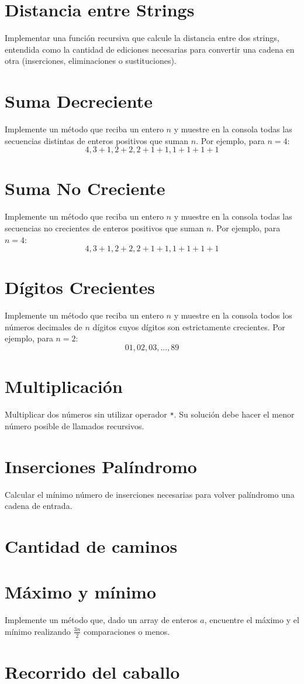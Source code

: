 \section{Distancia entre Strings}
Implementar una función recursiva que calcule la distancia entre dos strings, entendida como la cantidad de ediciones necesarias para convertir una cadena en otra (inserciones, eliminaciones o sustituciones).

\section{Suma Decreciente}
Implemente un método que reciba un entero \( n \) y muestre en la consola todas las secuencias distintas de enteros positivos que suman \( n \). Por ejemplo, para \( n = 4 \):
\[
4, 3+1, 2+2, 2+1+1, 1+1+1+1
\]

\section{Suma No Creciente}
Implemente un método que reciba un entero \( n \) y muestre en la consola todas las secuencias no crecientes de enteros positivos que suman \( n \). Por ejemplo, para \( n = 4 \):
\[
4, 3+1, 2+2, 2+1+1, 1+1+1+1
\]

\section{Dígitos Crecientes}
Implemente un método que reciba un entero \( n \) y muestre en la consola todos los números decimales de \( n \) dígitos cuyos dígitos son estrictamente crecientes. Por ejemplo, para \( n = 2 \):
\[
01, 02, 03, ..., 89
\]
        
\section{Multiplicación}
Multiplicar dos números sin utilizar operador \texttt{*}. Su solución debe hacer el menor número posible de llamados recursivos.

\section{Inserciones Palíndromo}
Calcular el mínimo número de inserciones necesarias para volver palíndromo una cadena de entrada.

\section{Cantidad de caminos}


\section{Máximo y mínimo}
Implemente un método que, dado un array de enteros \(a\), encuentre el máximo y el mínimo realizando \(\frac{3 n}{2}\) comparaciones o menos.

\section{Recorrido del caballo}

